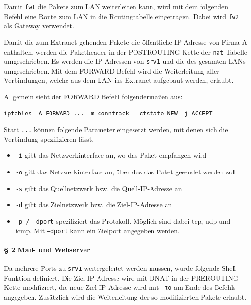 Damit {\tt fw1} die Pakete zum LAN weiterleiten kann, wird mit dem folgenden
Befehl eine Route zum LAN in die Routingtabelle eingetragen.
Dabei wird {\tt fw2} als Gateway verwendet.

\noindent Damit die zum Extranet gehenden Pakete die öffentliche IP-Adresse
von Firma A enthalten, werden die Paketheader in der POSTROUTING Kette der
{\tt nat} Tabelle umgeschrieben.
Es werden die IP-Adressen von {\tt srv1} und die des gesamten LANs
umgeschrieben.
Mit dem FORWARD Befehl wird die Weiterleitung aller Verbindungen,
welche aus dem LAN ins Extranet aufgebaut werden, erlaubt.


\noindent Allgemein sieht der FORWARD Befehl folgendermaßen aus:

\begin{verbatim}
iptables -A FORWARD ... -m conntrack --ctstate NEW -j ACCEPT
\end{verbatim}

\noindent Statt {\tt ...} können folgende Parameter eingesetzt werden,
mit denen sich die Verbindung spezifizieren lässt.

\begin{itemize}
  \item {\tt -i} gibt das Netzwerkinterface an, wo das Paket empfangen wird
  \item {\tt -o} gitt das Netzwerkinterface an, über das das Paket gesendet werden soll
  \item {\tt -s} gibt das Quellnetzwerk bzw. die Quell-IP-Adresse an
  \item {\tt -d} gibt das Zielnetzwerk bzw. die Ziel-IP-Adresse an
  \item {\tt -p / --dport} spezifiziert das Protokoll. Möglich sind dabei tcp, udp und icmp. Mit {\tt --dport} kann ein Zielport angegeben werden.
\end{itemize}

\paragraph{§ 2 Mail- und Webserver}

Da mehrere Ports zu {\tt srv1} weitergeleitet werden müssen, wurde folgende
Shell-Funktion definiert.
Die Ziel-IP-Adresse wird mit DNAT in der PREROUTING Kette modifiziert,
die neue Ziel-IP-Adresse wird mit {\tt --to} am Ende des Befehls angegeben.
Zusätzlich wird die Weiterleitung der so modifizierten Pakete erlaubt.

